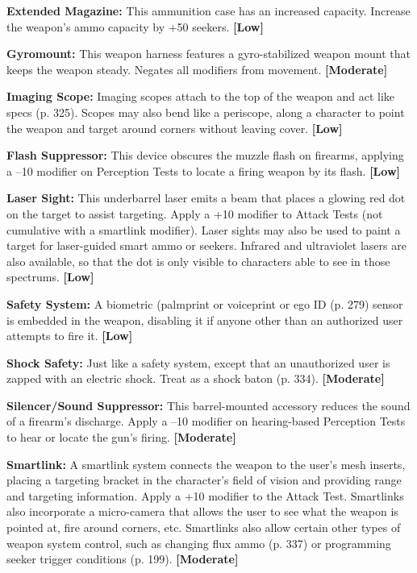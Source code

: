 \textbf{Extended Magazine:} This ammunition case has 
an increased capacity. Increase the weapon's ammo 
capacity by +50%
seekers. \textbf{[Low]}

\textbf{Gyromount:} This weapon harness features a gyro-stabilized
weapon mount that keeps the weapon steady.
Negates all modifiers from movement. \textbf{[Moderate]}

\textbf{Imaging Scope:} Imaging scopes attach to the top of 
the weapon and act like specs (p. 325). Scopes may 
also bend like a periscope, along a character to point 
the weapon and target around corners without leaving
cover. \textbf{[Low]}

\textbf{Flash Suppressor:} This device obscures the muzzle 
flash on firearms, applying a –10 modifier on Perception
Tests to locate a firing weapon by its flash. \textbf{[Low]}

\textbf{Laser Sight:} This underbarrel laser emits a beam 
that places a glowing red dot on the target to assist 
targeting. Apply a +10 modifier to Attack Tests (not 
cumulative with a smartlink modifier). Laser sights 
may also be used to paint a target for laser-guided 
smart ammo or seekers. Infrared and ultraviolet lasers 
are also available, so that the dot is only visible to 
characters able to see in those spectrums. \textbf{[Low]}

\textbf{Safety System: }A biometric (palmprint or voiceprint
or ego ID (p. 279) sensor is embedded in the
weapon, disabling it if anyone other than an authorized
user attempts to fire it. \textbf{[Low]}

\textbf{Shock Safety:} Just like a safety system, except that 
an unauthorized user is zapped with an electric shock. 
Treat as a shock baton (p. 334). \textbf{[Moderate]}

\textbf{Silencer/Sound Suppressor:} This barrel-mounted 
accessory reduces the sound of a firearm's discharge. 
Apply a –10 modifier on hearing-based Perception 
Tests to hear or locate the gun's firing. \textbf{[Moderate]}

\textbf{Smartlink:} A smartlink system connects the weapon 
to the user's mesh inserts, placing a targeting bracket 
in the character's field of vision and providing range 
and targeting information. Apply a +10 modifier to 
the Attack Test. Smartlinks also incorporate a micro-camera
that allows the user to see what the weapon
is pointed at, fire around corners, etc. Smartlinks also 
allow certain other types of weapon system control, 
such as changing flux ammo (p. 337) or programming 
seeker trigger conditions (p. 199). \textbf{[Moderate]}

